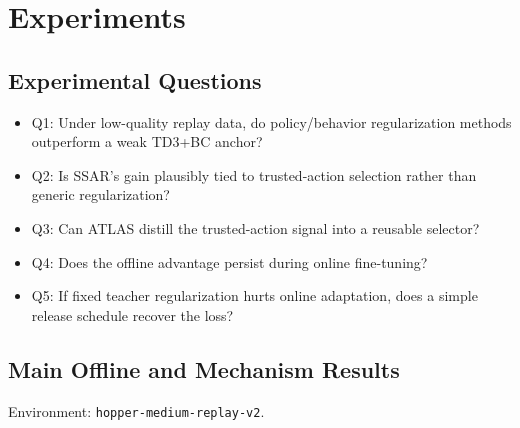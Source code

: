 \section{Experiments}

\subsection{Experimental Questions}

\begin{itemize}[leftmargin=*]
  \item Q1: Under low-quality replay data, do policy/behavior regularization methods outperform a weak TD3+BC anchor?
  \item Q2: Is SSAR's gain plausibly tied to trusted-action selection rather than generic regularization?
  \item Q3: Can ATLAS distill the trusted-action signal into a reusable selector?
  \item Q4: Does the offline advantage persist during online fine-tuning?
  \item Q5: If fixed teacher regularization hurts online adaptation, does a simple release schedule recover the loss?
\end{itemize}


\subsection{Main Offline and Mechanism Results}

Environment: \texttt{hopper-medium-replay-v2}.


